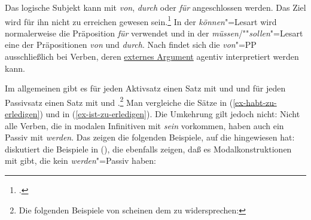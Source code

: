 \zl
Das logische Subjekt kann mit \emph{von}, \emph{durch} oder \emph{für} angeschlossen werden.
\ea
Das Ziel wird für ihn nicht zu erreichen gewesen sein.\footnote{
         .
}
\z
In der \emph{können}"=Lesart wird normalerweise die Präposition \emph{für} verwendet und in der
\emph{müssen}/""\emph{sollen}"=Lesart eine der Präpositionen \emph{von} und \emph{durch}.
%
%
Nach \citet[]{Demske94a} findet sich die \emph{von}"=PP ausschließlich bei Verben,
deren \hyperlink{externesArgument}{externes Argument}
agentiv interpretiert werden kann.

Im allgemeinen gibt es für jeden Aktivsatz einen Satz mit \zuinf und \haben und für jeden
Passivsatz einen Satz mit \zuinf und \sein \citep*[]{Bierwisch63a}.\footnote{
Die folgenden Beispiele von \citet[]{Demske94a} scheinen dem zu widersprechen:
\eal
{}
\zllast
%
}
Man vergleiche die Sätze in (\ref{ex-habt-zu-erledigen}) und in (\ref{ex-ist-zu-erledigen}).
Die Umkehrung gilt jedoch nicht: Nicht alle Verben, die in modalen Infinitiven mit \emph{sein} vorkommen,
haben auch ein Passiv mit \emph{werden}. Das zeigen die folgenden
Beispiele, auf die \citet[]{Hoehle78a} hingewiesen hat:
\eal
{}
\zl
\citet[]{Haider86} diskutiert die Beispiele in (), die ebenfalls
zeigen, daß es Modalkonstruktionen mit \sein gibt, die kein \emph{werden}"=Passiv haben:
\eal
{}
\zl
